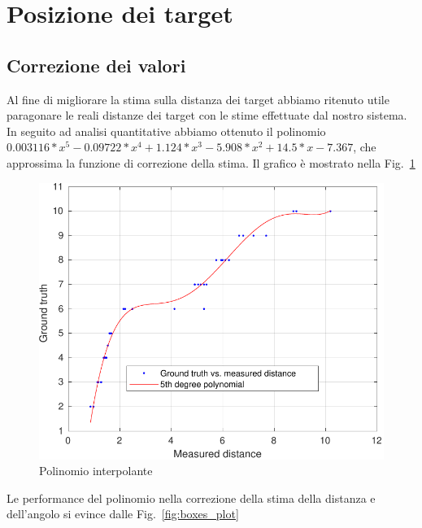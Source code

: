 \documentclass[a4paper]{article}
\begin{document}
	\section{Posizione dei target}\label{sec:Posizione-dei-target}

	
	\subsection{Correzione dei valori}\label{subsec:Correzione-dei-valori}
	Al fine di migliorare la stima sulla distanza dei target abbiamo ritenuto utile paragonare le reali distanze dei target con le stime effettuate dal nostro sistema. In seguito ad analisi quantitative abbiamo ottenuto il polinomio 	$0.003116*x^5 - 0.09722*x^4 + 1.124*x^3 -5.908*x^2 + 14.5*x-7.367$,  che approssima la funzione di correzione della stima. Il grafico è mostrato nella Fig.~\ref{fig:interpolation}
	
	\begin{figure}[H]
		\centering
		\includegraphics[width=1\textwidth]{./img/interpolation.pdf}
		\caption{Polinomio interpolante}
		\label{fig:interpolation}
	\end{figure}

	Le performance del polinomio nella correzione della stima della distanza e dell'angolo si evince dalle Fig.~\ref{fig:boxes_plot}
\end{document}
